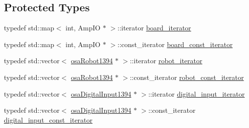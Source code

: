 \subsection*{Protected Types}
\begin{DoxyCompactItemize}
\item 
typedef std\+::map$<$ int, Amp\+I\+O $\ast$ $>$\+::iterator \hyperlink{classsaw_robot_i_o1394_1_1osa_port1394_ab2ec914caff42e3180aff52b41643292}{board\+\_\+iterator}
\item 
typedef std\+::map$<$ int, Amp\+I\+O $\ast$ $>$\+::const\+\_\+iterator \hyperlink{classsaw_robot_i_o1394_1_1osa_port1394_a31632fbc6a8e493a8a1e0e48208f43d0}{board\+\_\+const\+\_\+iterator}
\item 
typedef std\+::vector$<$ \hyperlink{classsaw_robot_i_o1394_1_1osa_robot1394}{osa\+Robot1394} $\ast$ $>$\+::iterator \hyperlink{classsaw_robot_i_o1394_1_1osa_port1394_a2e6156bdb43167b1dc7d3ff98fdb1761}{robot\+\_\+iterator}
\item 
typedef std\+::vector$<$ \hyperlink{classsaw_robot_i_o1394_1_1osa_robot1394}{osa\+Robot1394} $\ast$ $>$\+::const\+\_\+iterator \hyperlink{classsaw_robot_i_o1394_1_1osa_port1394_a2cfdedd5dac44343f9b00f40aeff218c}{robot\+\_\+const\+\_\+iterator}
\item 
typedef std\+::vector$<$ \hyperlink{classsaw_robot_i_o1394_1_1osa_digital_input1394}{osa\+Digital\+Input1394} $\ast$ $>$\+::iterator \hyperlink{classsaw_robot_i_o1394_1_1osa_port1394_a4915e713bba71fecf60a3a761a932485}{digital\+\_\+input\+\_\+iterator}
\item 
typedef std\+::vector$<$ \hyperlink{classsaw_robot_i_o1394_1_1osa_digital_input1394}{osa\+Digital\+Input1394} $\ast$ $>$\+::const\+\_\+iterator \hyperlink{classsaw_robot_i_o1394_1_1osa_port1394_ad95ebd8e21bd3394aaa54a24ba424d7c}{digital\+\_\+input\+\_\+const\+\_\+iterator}
\end{DoxyCompactItemize}

